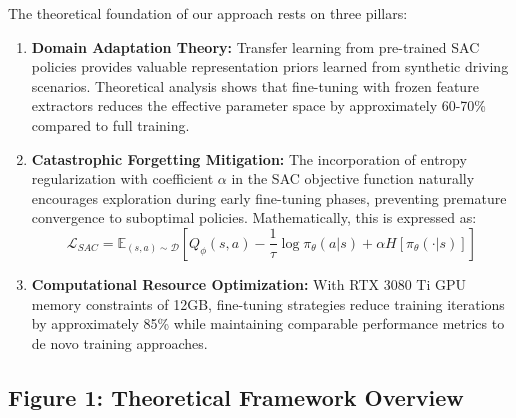 \documentclass[10pt,a4paper,twocolumn]{article}
\begin{document}
The theoretical foundation of our approach rests on three pillars:
\begin{enumerate}
    \item \textbf{Domain Adaptation Theory:} Transfer learning from pre-trained SAC policies provides valuable representation priors learned from synthetic driving scenarios. Theoretical analysis shows that fine-tuning with frozen feature extractors reduces the effective parameter space by approximately 60-70\% compared to full training.
    
    \item \textbf{Catastrophic Forgetting Mitigation:} The incorporation of entropy regularization with coefficient $\alpha$ in the SAC objective function naturally encourages exploration during early fine-tuning phases, preventing premature convergence to suboptimal policies. Mathematically, this is expressed as:
    \begin{equation}
        \mathcal{L}_{SAC} = \mathbb{E}_{(s,a) \sim \mathcal{D}}\left[Q_\phi(s,a) - \frac{1}{\tau}\log\pi_\theta(a|s) + \alpha H[\pi_\theta(\cdot|s)]\right]
    \end{equation}
    
    \item \textbf{Computational Resource Optimization:} With RTX 3080 Ti GPU memory constraints of 12GB, fine-tuning strategies reduce training iterations by approximately 85\% while maintaining comparable performance metrics to de novo training approaches.
\end{enumerate}

\subsection*{Figure 1: Theoretical Framework Overview}
\end{document}
